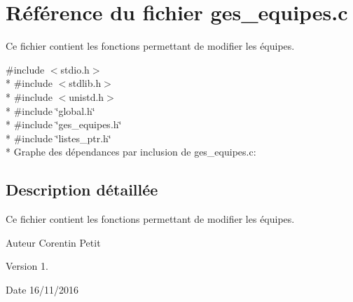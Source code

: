 \hypertarget{a00016}{}\section{Référence du fichier ges\+\_\+equipes.\+c}
\label{a00016}


Ce fichier contient les fonctions permettant de modifier les équipes.  


{\ttfamily \#include $<$stdio.\+h$>$}\\*
{\ttfamily \#include $<$stdlib.\+h$>$}\\*
{\ttfamily \#include $<$unistd.\+h$>$}\\*
{\ttfamily \#include \char`\"{}global.\+h\char`\"{}}\\*
{\ttfamily \#include \char`\"{}ges\+\_\+equipes.\+h\char`\"{}}\\*
{\ttfamily \#include \char`\"{}listes\+\_\+ptr.\+h\char`\"{}}\\*
Graphe des dépendances par inclusion de ges\+\_\+equipes.\+c\+:


\subsection{Description détaillée}
Ce fichier contient les fonctions permettant de modifier les équipes. 

\begin{DoxyAuthor}{Auteur}
Corentin Petit 
\end{DoxyAuthor}
\begin{DoxyVersion}{Version}
1. 
\end{DoxyVersion}
\begin{DoxyDate}{Date}
16/11/2016 
\end{DoxyDate}
